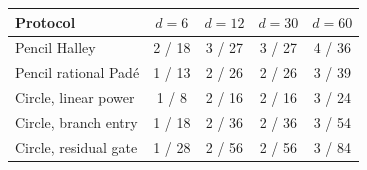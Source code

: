 \begin{tabularx}{\linewidth}{@{}Xcccc@{}}\toprule
Protocol & $d=6$ & $d=12$ & $d=30$ & $d=60$\\\midrule
Pencil Halley & 2 / 18 & 3 / 27 & 3 / 27 & 4 / 36\\
Pencil rational Pad\'e & 1 / 13 & 2 / 26 & 2 / 26 & 3 / 39\\
Circle, linear power & 1 / 8 & 2 / 16 & 2 / 16 & 3 / 24\\
Circle, branch entry & 1 / 18 & 2 / 36 & 2 / 36 & 3 / 54\\
Circle, residual gate & 1 / 28 & 2 / 56 & 2 / 56 & 3 / 84\\
\bottomrule\end{tabularx}
